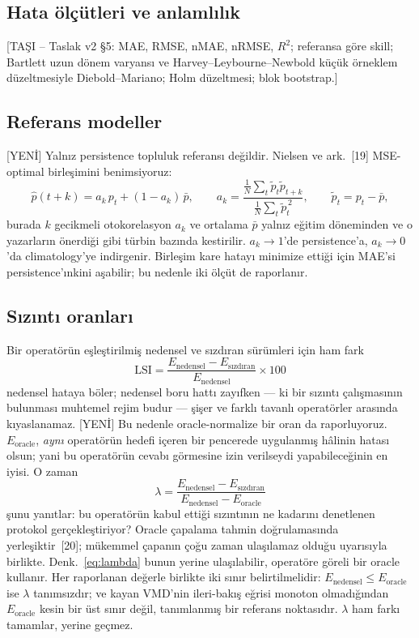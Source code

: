 \documentclass[11pt,a4paper]{article}
\newcommand{\tasi}[1]{\textsf{\small [TAŞI -- #1]}}
\begin{document}
\subsection{Hata ölçütleri ve anlamlılık}
\tasi{Taslak v2 §5: MAE, RMSE, nMAE, nRMSE, $R^2$; referansa göre skill;
Bartlett uzun dönem varyansı ve Harvey--Leybourne--Newbold küçük örneklem
düzeltmesiyle Diebold--Mariano; Holm düzeltmesi; blok bootstrap.}

\subsection{Referans modeller}
\textsf{[YENİ]} Yalnız persistence topluluk referansı değildir. Nielsen ve
ark.~[19] MSE-optimal birleşimini benimsiyoruz:
\begin{equation}
\hat p(t+k) = a_k\,p_t + (1-a_k)\,\bar p,
\qquad
a_k = \frac{\frac{1}{N}\sum_t \tilde p_t \tilde p_{t+k}}
            {\frac{1}{N}\sum_t \tilde p_t^{\,2}},
\qquad \tilde p_t = p_t-\bar p,
\label{eq:nielsen}
\end{equation}
burada $k$ gecikmeli otokorelasyon $a_k$ ve ortalama $\bar p$ yalnız eğitim
döneminden ve o yazarların önerdiği gibi türbin bazında kestirilir.
$a_k\to1$'de persistence'a, $a_k\to0$'da climatology'ye indirgenir. Birleşim
kare hatayı minimize ettiği için MAE'si persistence'ınkini aşabilir; bu nedenle
iki ölçüt de raporlanır.

\subsection{Sızıntı oranları}
Bir operatörün eşleştirilmiş nedensel ve sızdıran sürümleri için ham fark
\begin{equation}
\mathrm{LSI} =
\frac{E_{\mathrm{nedensel}}-E_{\mathrm{sızdıran}}}{E_{\mathrm{nedensel}}}\times 100
\end{equation}
nedensel hataya böler; nedensel boru hattı zayıfken --- ki bir sızıntı
çalışmasının bulunması muhtemel rejim budur --- şişer ve farklı tavanlı
operatörler arasında kıyaslanamaz.
\textsf{[YENİ]} Bu nedenle oracle-normalize bir oran da raporluyoruz.
$E_{\mathrm{oracle}}$, \emph{aynı} operatörün hedefi içeren bir pencerede
uygulanmış hâlinin hatası olsun; yani bu operatörün cevabı görmesine izin
verilseydi yapabileceğinin en iyisi. O zaman
\begin{equation}
\lambda =
\frac{E_{\mathrm{nedensel}}-E_{\mathrm{sızdıran}}}
     {E_{\mathrm{nedensel}}-E_{\mathrm{oracle}}}
\label{eq:lambda}
\end{equation}
şunu yanıtlar: bu operatörün kabul ettiği sızıntının ne kadarını denetlenen
protokol gerçekleştiriyor? Oracle çapalama tahmin doğrulamasında yerleşiktir~[20];
mükemmel çapanın çoğu zaman ulaşılamaz olduğu uyarısıyla birlikte.
Denk.~\eqref{eq:lambda} bunun yerine ulaşılabilir, operatöre göreli bir oracle
kullanır. Her raporlanan değerle birlikte iki sınır belirtilmelidir:
$E_{\mathrm{nedensel}}\le E_{\mathrm{oracle}}$ ise $\lambda$ tanımsızdır; ve
kayan VMD'nin ileri-bakış eğrisi monoton olmadığından $E_{\mathrm{oracle}}$
kesin bir üst sınır değil, tanımlanmış bir referans noktasıdır. $\lambda$ ham
farkı tamamlar, yerine geçmez.
\end{document}

